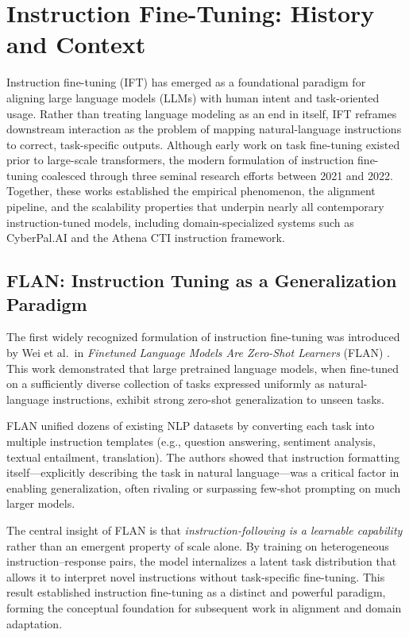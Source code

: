 \documentclass[unnumsec,webpdf,contemporary,large]{oup-authoring-template}
\theoremstyle{thmstyleone}
\theoremstyle{thmstyletwo}
\theoremstyle{thmstylethree}
\begin{document}
\section{Instruction Fine-Tuning: History and Context}
\label{sec:ift-history}

Instruction fine-tuning (IFT) has emerged as a foundational paradigm for aligning large language models (LLMs) with human intent and task-oriented usage. Rather than treating language modeling as an end in itself, IFT reframes downstream interaction as the problem of mapping natural-language instructions to correct, task-specific outputs. Although early work on task fine-tuning existed prior to large-scale transformers, the modern formulation of instruction fine-tuning coalesced through three seminal research efforts between 2021 and 2022. Together, these works established the empirical phenomenon, the alignment pipeline, and the scalability properties that underpin nearly all contemporary instruction-tuned models, including domain-specialized systems such as CyberPal.AI and the Athena CTI instruction framework.

\subsection{FLAN: Instruction Tuning as a Generalization Paradigm}

The first widely recognized formulation of instruction fine-tuning was introduced by Wei et al.\ in \emph{Finetuned Language Models Are Zero-Shot Learners} (FLAN) \cite{wei2022flan}. This work demonstrated that large pretrained language models, when fine-tuned on a sufficiently diverse collection of tasks expressed uniformly as natural-language instructions, exhibit strong zero-shot generalization to unseen tasks.

FLAN unified dozens of existing NLP datasets by converting each task into multiple instruction templates (e.g., question answering, sentiment analysis, textual entailment, translation). The authors showed that instruction formatting itself---explicitly describing the task in natural language---was a critical factor in enabling generalization, often rivaling or surpassing few-shot prompting on much larger models.

The central insight of FLAN is that \emph{instruction-following is a learnable capability} rather than an emergent property of scale alone. By training on heterogeneous instruction--response pairs, the model internalizes a latent task distribution that allows it to interpret novel instructions without task-specific fine-tuning. This result established instruction fine-tuning as a distinct and powerful paradigm, forming the conceptual foundation for subsequent work in alignment and domain adaptation.
\end{document}
